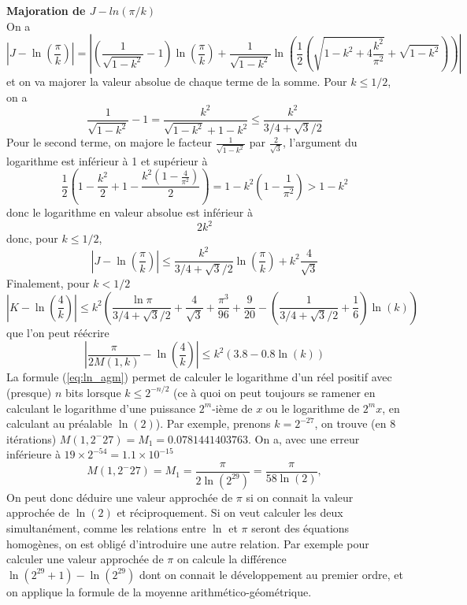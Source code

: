 \documentclass[a4paper,11pt]{article}
\begin{document}
\begin{giacjshere}
{\bf Majoration de $J-ln(\pi/k)$}\\
On a
\[ |J - \ln\left(\frac{\pi}{k}\right)|
= \left| (\frac{1}{\sqrt{1-k^2}}-1) \ln\left(\frac{\pi}{k}\right)
+ \frac{1}{\sqrt{1-k^2}}
\ln\left( \frac{1}{2} \left(\sqrt{ 1-k^{2} +4 \frac{k^{2}}{\pi^2}} 
+\sqrt{1-k^{2}} \right) \right) \right| \]
et on va majorer la valeur absolue de chaque terme de la somme.
Pour $k\leq 1/2$, on a
\[ \frac{1}{\sqrt{1-k^2}}-1=\frac{k^2}{\sqrt{1-k^2}+1-k^2} \leq \frac{k^2}{3/4+\sqrt{3}/2} \]
Pour le second terme, on majore le facteur $\frac{1}{\sqrt{1-k^2}}$ par $\frac{2}{\sqrt{3}}$,
l'argument du logarithme est inférieur à 1 et supérieur à
\[ 
\frac{1}{2}(1 - \frac{k^2}{2} +1- \frac{k^2(1-\frac{4}{\pi^2})}{2})
= 1 - k^2 ( 1-\frac{1}{\pi^2}) > 1-k^2
\]
donc le logarithme en valeur absolue est inférieur à
\[ 2 k^2 \]
donc, pour $k\leq 1/2$,
\[ |J-\ln\left(\frac{\pi}{k}\right)| \leq 
\frac{k^2}{3/4+\sqrt{3}/2} \ln\left(\frac{\pi}{k}\right)
+ k^2 \frac{4}{\sqrt{3}} 
\]
Finalement, pour $k<1/2$
\begin{equation} \label{eq:ln_agm0}
 |K-\ln\left(\frac{4}{k}\right) | 
\leq k^2 \left( \frac{\ln \pi}{3/4+\sqrt{3}/2}  + \frac{4}{\sqrt{3} }
+ \frac{\pi^3}{96} + \frac{9}{20}
- (\frac{1}{3/4+\sqrt{3}/2}+\frac{1}{6}) \ln(k) \right) 
\end{equation}
que l'on peut réécrire
\begin{equation} \label{eq:ln_agm}
|\frac{\pi}{2M(1,k)}-\ln\left(\frac{4}{k}\right) |
\leq  k^2(3.8-0.8\ln(k))
\end{equation}
La formule (\ref{eq:ln_agm}) 
permet de calculer le logarithme d'un r\'eel positif
avec (presque) $n$ bits 
lorsque $k \leq 2^{-n/2}$ (ce \`a quoi on peut toujours se ramener
en calculant le logarithme d'une puissance $2^m$-i\`eme de $x$ ou
le logarithme de $2^{m}x$, en calculant au pr\'ealable $\ln(2)$).
Par exemple, prenons $k=2^{-27}$, on trouve (en 8 itérations)
$M(1,2^-{27})=M_1=0.0781441403763$. 
On a, avec une erreur inférieure à $19 \times 2^{-54}=1.1\times 10^{-15}$
\[ 
M(1,2^-{27})=M_1=\frac{\pi}{2\ln(2^{29})}=\frac{\pi}{58\ln(2)},
\] 
On peut donc d\'eduire une valeur approch\'ee de $\pi $ si on connait
la valeur approchée de $\ln(2)$ et réciproquement.
Si on veut calculer les deux simultan\'ement, comme les relations entre $\ln$
et $\pi$ seront des \'equations homog\`enes, on est oblig\'e
d'introduire une autre relation. Par exemple pour calculer une
valeur approch\'ee de $\pi$ on calcule la diff\'erence
$\ln(2^{29}+1)-\ln(2^{29})$ dont on connait le d\'eveloppement au premier
ordre, et on applique la formule de la moyenne arithm\'etico-g\'eom\'etrique.

\end{giacjshere}
\end{document}
